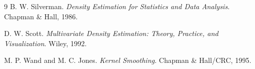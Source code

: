 \documentclass[11pt,a4paper]{article}
\begin{document}
\begin{thebibliography}{9}
B. W. Silverman.
\newblock \emph{Density Estimation for Statistics and Data Analysis}.
\newblock Chapman \& Hall, 1986.

D. W. Scott.
\newblock \emph{Multivariate Density Estimation: Theory, Practice, and Visualization}.
\newblock Wiley, 1992.

M. P. Wand and M. C. Jones.
\newblock \emph{Kernel Smoothing}.
\newblock Chapman \& Hall/CRC, 1995.
\end{thebibliography}
\end{document}

